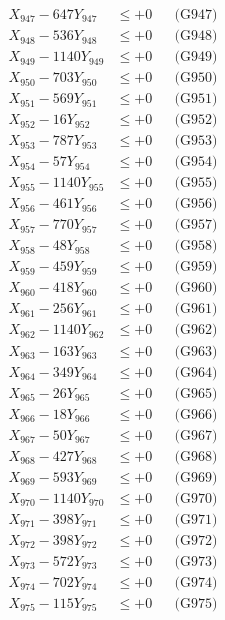 \documentclass[a4paper,10pt]{article}
\begin{document}
{\begin{align}
X_{947} - 647Y_{947} &\leq +0 && \text{(G947)} \\
X_{948} - 536Y_{948} &\leq +0 && \text{(G948)} \\
X_{949} - 1140Y_{949} &\leq +0 && \text{(G949)} \\
X_{950} - 703Y_{950} &\leq +0 && \text{(G950)} \\
\allowbreak
X_{951} - 569Y_{951} &\leq +0 && \text{(G951)} \\
X_{952} - 16Y_{952} &\leq +0 && \text{(G952)} \\
X_{953} - 787Y_{953} &\leq +0 && \text{(G953)} \\
X_{954} - 57Y_{954} &\leq +0 && \text{(G954)} \\
X_{955} - 1140Y_{955} &\leq +0 && \text{(G955)} \\
X_{956} - 461Y_{956} &\leq +0 && \text{(G956)} \\
X_{957} - 770Y_{957} &\leq +0 && \text{(G957)} \\
X_{958} - 48Y_{958} &\leq +0 && \text{(G958)} \\
X_{959} - 459Y_{959} &\leq +0 && \text{(G959)} \\
X_{960} - 418Y_{960} &\leq +0 && \text{(G960)} \\
\allowbreak
X_{961} - 256Y_{961} &\leq +0 && \text{(G961)} \\
X_{962} - 1140Y_{962} &\leq +0 && \text{(G962)} \\
X_{963} - 163Y_{963} &\leq +0 && \text{(G963)} \\
X_{964} - 349Y_{964} &\leq +0 && \text{(G964)} \\
X_{965} - 26Y_{965} &\leq +0 && \text{(G965)} \\
X_{966} - 18Y_{966} &\leq +0 && \text{(G966)} \\
X_{967} - 50Y_{967} &\leq +0 && \text{(G967)} \\
X_{968} - 427Y_{968} &\leq +0 && \text{(G968)} \\
X_{969} - 593Y_{969} &\leq +0 && \text{(G969)} \\
X_{970} - 1140Y_{970} &\leq +0 && \text{(G970)} \\
\allowbreak
X_{971} - 398Y_{971} &\leq +0 && \text{(G971)} \\
X_{972} - 398Y_{972} &\leq +0 && \text{(G972)} \\
X_{973} - 572Y_{973} &\leq +0 && \text{(G973)} \\
X_{974} - 702Y_{974} &\leq +0 && \text{(G974)} \\
X_{975} - 115Y_{975} &\leq +0 && \text{(G975)} \\

\end{align}}
\end{document}
